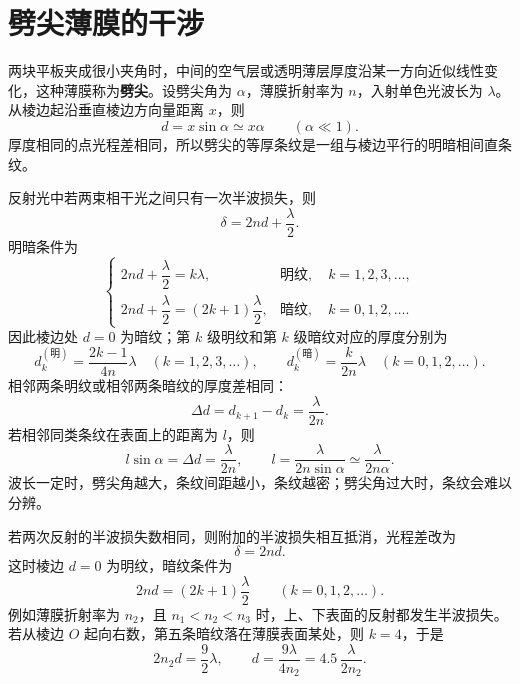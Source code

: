 
\section{劈尖薄膜的干涉}

\begin{conclusion}[劈尖薄膜的干涉]
两块平板夹成很小夹角时，中间的空气层或透明薄层厚度沿某一方向近似线性变化，这种薄膜称为\textbf{劈尖}。设劈尖角为 \(\alpha\)，薄膜折射率为 \(n\)，入射单色光波长为 \(\lambda\)。从棱边起沿垂直棱边方向量距离 \(x\)，则
\[
d=x\sin\alpha\simeq x\alpha\qquad(\alpha\ll 1).
\]
厚度相同的点光程差相同，所以劈尖的等厚条纹是一组与棱边平行的明暗相间直条纹。

反射光中若两束相干光之间只有一次半波损失，则
\[
\delta=2nd+\frac{\lambda}{2}.
\]
明暗条件为
\[
\begin{cases}
2nd+\dfrac{\lambda}{2}=k\lambda, & \text{明纹},\quad k=1,2,3,\dots,\\[6pt]
2nd+\dfrac{\lambda}{2}=(2k+1)\dfrac{\lambda}{2}, & \text{暗纹},\quad k=0,1,2,\dots.
\end{cases}
\]
因此棱边处 \(d=0\) 为暗纹；第 \(k\) 级明纹和第 \(k\) 级暗纹对应的厚度分别为
\[
d_k^{(\text{明})}=\frac{2k-1}{4n}\lambda\quad(k=1,2,3,\dots),
\qquad
d_k^{(\text{暗})}=\frac{k}{2n}\lambda\quad(k=0,1,2,\dots).
\]
相邻两条明纹或相邻两条暗纹的厚度差相同：
\[
\Delta d=d_{k+1}-d_k=\frac{\lambda}{2n}.
\]
若相邻同类条纹在表面上的距离为 \(l\)，则
\[
l\sin\alpha=\Delta d=\frac{\lambda}{2n},
\qquad
l=\frac{\lambda}{2n\sin\alpha}\simeq \frac{\lambda}{2n\alpha}.
\]
波长一定时，劈尖角越大，条纹间距越小，条纹越密；劈尖角过大时，条纹会难以分辨。

若两次反射的半波损失数相同，则附加的半波损失相互抵消，光程差改为
\[
\delta=2nd.
\]
这时棱边 \(d=0\) 为明纹，暗纹条件为
\[
2nd=(2k+1)\frac{\lambda}{2}\qquad(k=0,1,2,\dots).
\]
例如薄膜折射率为 \(n_2\)，且 \(n_1<n_2<n_3\) 时，上、下表面的反射都发生半波损失。若从棱边 \(O\) 起向右数，第五条暗纹落在薄膜表面某处，则 \(k=4\)，于是
\[
2n_2d=\frac{9}{2}\lambda,
\qquad
d=\frac{9\lambda}{4n_2}
=4.5\,\frac{\lambda}{2n_2}.
\]


\end{conclusion}
